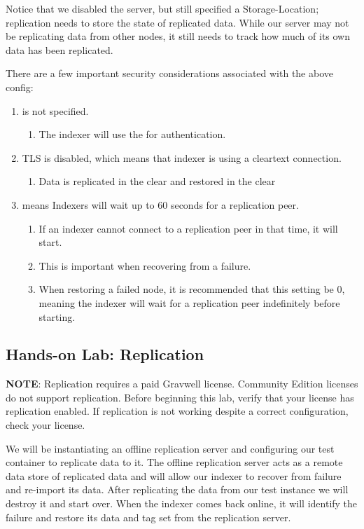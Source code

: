 {Notice that we disabled the server, but still specified a
Storage-Location; replication needs to store the state of replicated
data. While our server may not be replicating data from other nodes, it
still needs to track how much of its own data has been replicated.

There are a few important security considerations associated with the
above config:
\begin{enumerate}
	\item {} is not specified.
	\begin{enumerate}
		\item The indexer will use the  for authentication.
	\end{enumerate}
	\item TLS is disabled, which means that indexer is using a cleartext connection.
	\begin{enumerate}
		\item Data is replicated in the clear and restored in the clear
	\end{enumerate}
	\item {} means Indexers will wait up to 60 seconds for a replication peer.
	\begin{enumerate}
		\item If an indexer cannot connect to a replication peer in that time, it will start.
		\item This is important when recovering from a failure.
		\item When restoring a failed node, it is recommended that this setting be 0, meaning the indexer will wait for a replication peer indefinitely before starting.
	\end{enumerate}
\end{enumerate}

\clearpage
\subsection{Hands-on Lab: Replication}

\textbf{NOTE}: Replication requires a paid Gravwell license. Community Edition licenses do not support replication. Before beginning this lab, verify that your license has replication enabled. If replication is not working despite a correct configuration, check your license.

We will be instantiating an offline replication server and configuring
our test container to replicate data to it. The offline replication
server acts as a remote data store of replicated data and will allow our
indexer to recover from failure and re-import its data. After
replicating the data from our test instance we will destroy it and start
over. When the indexer comes back online, it will identify the failure
and restore its data and tag set from the replication server.

}
